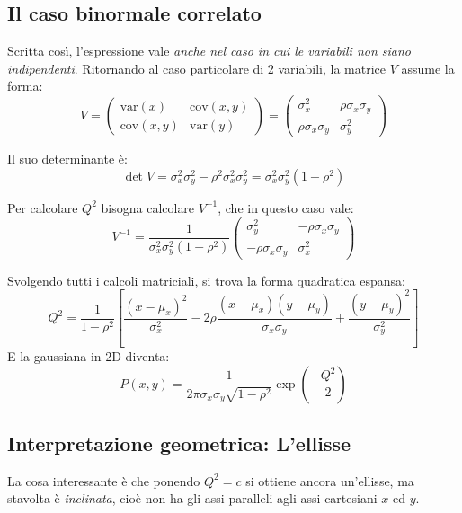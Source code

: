\documentclass[openany,a4paper,12pt]{book}
\theoremstyle{remark}
\begin{document}
\subsection*{Il caso binormale correlato}
Scritta così, l'espressione vale \emph{anche nel caso in cui le variabili non siano indipendenti}. Ritornando al caso particolare di 2 variabili, la matrice $V$ assume la forma:
\begin{equation}
V = \begin{pmatrix}
\text{var}(x) & \text{cov}(x,y) \\
\text{cov}(x,y) & \text{var}(y)
\end{pmatrix} = \begin{pmatrix}
\sigma_x^2 & \rho \sigma_x \sigma_y \\
\rho \sigma_x \sigma_y & \sigma_y^2
\end{pmatrix}
\end{equation}

Il suo determinante è:
\begin{equation}
\det V = \sigma_x^2 \sigma_y^2 - \rho^2 \sigma_x^2 \sigma_y^2 = \sigma_x^2 \sigma_y^2 (1 - \rho^2)
\end{equation}

Per calcolare $Q^2$ bisogna calcolare $V^{-1}$, che in questo caso vale:
\begin{equation}
V^{-1} = \frac{1}{\sigma_x^2\sigma_y^2(1-\rho^2)} \begin{pmatrix}
\sigma_y^2 & -\rho\sigma_x\sigma_y \\
-\rho\sigma_x\sigma_y & \sigma_x^2
\end{pmatrix}
\end{equation}

Svolgendo tutti i calcoli matriciali, si trova la forma quadratica espansa:
\begin{equation}
Q^2 = \frac{1}{1-\rho^2} \left[ \frac{(x-\mu_x)^2}{\sigma_x^2} - 2\rho\frac{(x-\mu_x)(y-\mu_y)}{\sigma_x\sigma_y} + \frac{(y-\mu_y)^2}{\sigma_y^2} \right]
\end{equation}
E la gaussiana in 2D diventa:
\begin{equation}
P(x,y) = \frac{1}{2\pi\sigma_x\sigma_y\sqrt{1-\rho^2}} \exp\left(-\frac{Q^2}{2}\right)
\end{equation}

\subsection*{Interpretazione geometrica: L'ellisse}
La cosa interessante è che ponendo $Q^2 = c$ si ottiene ancora un'ellisse, ma stavolta è \emph{inclinata}, cioè non ha gli assi paralleli agli assi cartesiani $x$ ed $y$.
\end{document}
